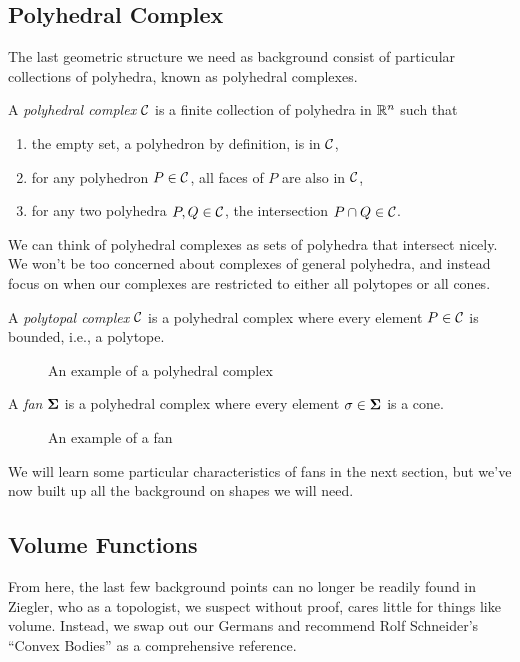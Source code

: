 \documentclass[12pt,oneside]{../../sfsuthesis}
\begin{document}
\subsection{Polyhedral Complex}
The last geometric structure we need as background consist of particular collections of polyhedra, known as polyhedral complexes.
\begin{definition}\th\label{def:polyhedralComplex}
    A \emph{polyhedral complex} \( \mathcal{C} \) is a finite collection of polyhedra in \( \mathbb{R}^n \) such that
    \begin{enumerate}
        \item the empty set, a polyhedron by definition, is in \( \mathcal{C} \),
        \item for any polyhedron \( P \in \mathcal{C} \), all faces of \( P \) are also in \( \mathcal{C} \),
        \item for any two polyhedra \( P, Q \in \mathcal{C} \), the intersection \( P \cap Q \in \mathcal{C} \).
    \end{enumerate}
\end{definition}
We can think of polyhedral complexes as sets of polyhedra that intersect nicely.
We won't be too concerned about complexes of general polyhedra, and instead focus on when our complexes are restricted to either all polytopes or all cones.
\begin{definition}\th\label{def:polytopalComplex}
    A \emph{polytopal complex} \( \mathcal{C} \) is a polyhedral complex where every element \( P \in \mathcal{C} \) is bounded, i.e., a polytope.
\end{definition}
\begin{figure}[H]
    \centering
    \caption{An example of a polyhedral complex}
\end{figure}
\begin{definition}[Fan]\th\label{def:fan}
    A \emph{fan} \( \bm{\Sigma} \) is a polyhedral complex where every element \( \sigma \in \bm{\Sigma} \) is a cone.
\end{definition}
\begin{figure}[H]
    \centering
    \caption{An example of a fan}
\end{figure}
We will learn some particular characteristics of fans in the next section, but we've now built up all the background on shapes we will need.

\subsection{Volume Functions}
From here, the last few background points can no longer be readily found in Ziegler, who as a topologist, we suspect without proof, cares little for things like volume.
Instead, we swap out our Germans and recommend Rolf Schneider's ``Convex Bodies'' \cite{schneiderConvexBodiesBrunn2013} as a comprehensive reference.
\end{document}
